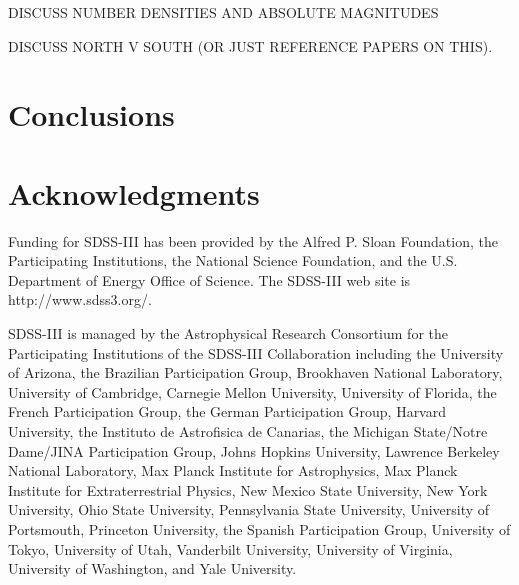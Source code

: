 \documentclass[preprint]{aastex}
\begin{document}
DISCUSS NUMBER DENSITIES AND ABSOLUTE MAGNITUDES

DISCUSS NORTH V SOUTH (OR JUST REFERENCE PAPERS ON THIS).

\section{Conclusions}


\section{Acknowledgments}

Funding for SDSS-III has been provided by the Alfred P. Sloan
Foundation, the Participating Institutions, the National Science
Foundation, and the U.S. Department of Energy Office of Science. The
SDSS-III web site is http://www.sdss3.org/.

SDSS-III is managed by the Astrophysical Research Consortium for the
Participating Institutions of the SDSS-III Collaboration including the
University of Arizona,
the Brazilian Participation Group,
Brookhaven National Laboratory,
University of Cambridge,
Carnegie Mellon University,
University of Florida,
the French Participation Group,
the German Participation Group,
Harvard University,
the Instituto de Astrofisica de Canarias,
the Michigan State/Notre Dame/JINA Participation Group,
Johns Hopkins University,
Lawrence Berkeley National Laboratory,
Max Planck Institute for Astrophysics,
Max Planck Institute for Extraterrestrial Physics,
New Mexico State University,
New York University,
Ohio State University,
Pennsylvania State University,
University of Portsmouth,
Princeton University,
the Spanish Participation Group,
University of Tokyo,
University of Utah,
Vanderbilt University,
University of Virginia,
University of Washington,
and Yale University.
\end{document}
